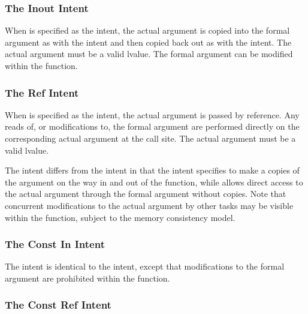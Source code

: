 \subsubsection{The Inout Intent}
\label{The_Inout_Intent}

When  is specified as the intent, the actual argument is
copied into the formal argument as with the  intent and then
copied back out as with the  intent.  The actual argument
must be a valid lvalue.  The formal argument can be modified within
the function.


\subsubsection{The Ref Intent}
\label{The_Ref_Intent}

When  is specified as the intent, the actual argument is
passed by reference.  Any reads of, or modifications to, the formal
argument are performed directly on the corresponding actual argument
at the call site.  The actual argument must be a valid lvalue.

The  intent differs from the  intent in that
the  intent specifies to make a copies of the argument on
the way in and out of the function, while  allows direct
access to the actual argument through the formal argument without
copies.  Note that concurrent modifications to the actual argument by
other tasks may be visible within the function, subject to the memory
consistency model.


\subsubsection{The Const In Intent}
\label{The_Const_In_Intent}

The  intent is identical to the  intent,
except that modifications to the formal argument are prohibited within
the function.


\subsubsection{The Const Ref Intent}
\label{The_Const_Ref_Intent}

